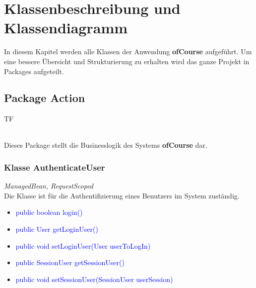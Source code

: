 	\newcommand{\class}[1]{\paragraph{Klasse #1:}\ \\ }
	\newcommand{\method}[1]{\textcolor{blue}{#1}}
	\newcommand{\kursiv}[1]{{\it #1}}
	\newcommand{\override}{{\it @Override}\ \\}
	
	\chapter{Klassenbeschreibung und Klassendiagramm}
	In diesem Kapitel werden alle Klassen der Anwendung \textbf{ofCourse} aufgeführt.
	Um eine bessere Übersicht und Strukturierung zu erhalten wird das ganze Projekt in Packages aufgeteilt.

	\section{Package Action}
		\begin{tiny}
			TF\\
		\end{tiny}\\
	Dieses Package stellt die Businesslogik des Systems \textbf{ofCourse} dar.
	\subsection{Klasse AuthenticateUser}
	\kursiv{ManagedBean, RequestScoped}\\
	Die Klasse ist für die Authentifizierung eines Benutzers im System zuständig.
	\begin{itemize}
		\item \method{public boolean login()}
		\item \method{public User getLoginUser()}
		\item \method{public void setLoginUser(User userToLogIn)}
		\item \method{public SessionUser getSessionUser()}
		\item \method{public void setSessionUser(SessionUser userSession)}
	\end{itemize}
	
